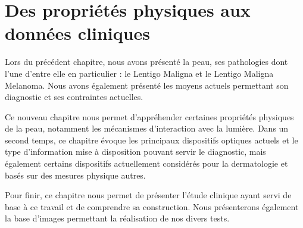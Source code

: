 \chapter{Des propriétés physiques aux données cliniques}
\label{chap:chapter_2}
\chapterintro
Lors du précédent chapitre, nous avons présenté la peau, ses pathologies dont l'une d'entre elle en particulier : le Lentigo Maligna et le Lentigo Maligna Melanoma. Nous avons également présenté les moyens actuels permettant son diagnostic et ses contraintes actuelles.\par

Ce nouveau chapitre nous permet d'appréhender certaines propriétés physiques de la peau, notamment les mécanismes d'interaction avec la lumière. Dans un second temps, ce chapitre évoque les principaux dispositifs optiques actuels et le type d'information mise à disposition pouvant servir le diagnostic, mais également certains dispositifs actuellement considérés pour la dermatologie et basés sur des mesures physique autres.\par

Pour finir, ce chapitre nous permet de présenter l'étude clinique ayant servi de base à ce travail et de comprendre sa construction. Nous présenterons également la base d'images permettant la réalisation de nos divers tests.\par 
\newpage

